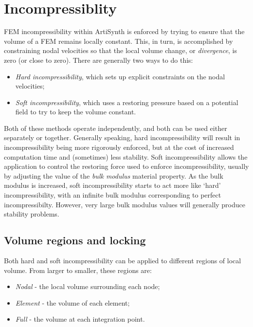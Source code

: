 \section{Incompressiblity}

FEM incompressibility within ArtiSynth is enforced by trying to ensure
that the volume of a FEM remains locally constant. This, in turn, is
accomplished by constraining nodal velocities so that the local volume change,
or \emph{divergence}, is zero (or close to zero). There are generally two
ways to do this:

\begin{itemize}
\item {\it Hard incompressibility}, which sets up explicit constraints on the
nodal velocities;
\item {\it Soft incompressibility}, which uses a restoring pressure based on a
potential field to try to keep the volume constant.
\end{itemize}

Both of these methods operate independently, and both can be used
either separately or together. Generally speaking, hard incompressibility
will result in incompressibility being more rigorously enforced, but
at the cost of increased computation time and (sometimes) less
stability. Soft incompressibility allows the application to control
the restoring force used to enforce incompressibility, usually by
adjusting the value of the \emph{bulk modulus} material property.  As
the bulk modulus is increased, soft incompressibility starts to act
more like `hard' incompressibility, with an infinite bulk modulus
corresponding to perfect incompressibilty. However, very large bulk
modulus values will generally produce stability problems.

\subsection{Volume regions and locking}
\label{VolumeRegions:sec}

Both hard and soft incompressibility can be applied to different
regions of local volume. From larger to smaller, these regions are:

\begin{itemize}
\item {\it Nodal} - the local volume surrounding each node;
\item {\it Element} - the volume of each element;
\item {\it Full} - the volume at each integration point.
\end{itemize}

